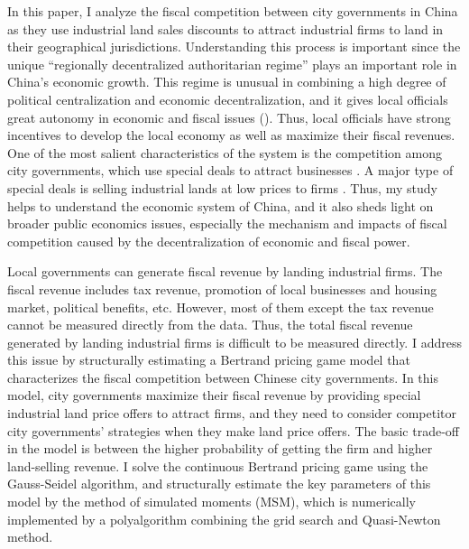 In this paper, I analyze the fiscal competition between city governments in China as they use
industrial land sales discounts to attract industrial firms to
land in their geographical jurisdictions.
Understanding this process is important since
the unique ``regionally decentralized authoritarian regime'' \citep{xu2011fundamental}
plays an important role in China's economic growth.
This regime is unusual in combining a high degree of political centralization
and economic decentralization, and it gives local officials great autonomy
in economic and fiscal issues (\citealp{kroeber2020china,xiong2018mandarin}).
Thus, local officials have strong
incentives to develop the local economy as well as maximize their fiscal revenues.
One of the most salient characteristics of the system is the
competition among city governments, which use special deals to
attract businesses \citep{bai2020special}. A major type of special deals is
selling industrial lands at low prices to firms \citep{su2017china}.
Thus, my study helps to understand the economic
system of China, and it also sheds light on broader public economics issues, especially the mechanism
and impacts of fiscal competition caused by the decentralization of economic and fiscal power.

Local governments can generate fiscal revenue by landing industrial firms.
The fiscal revenue includes tax revenue, promotion of local businesses
and housing market, political benefits, etc. However, most of them except the tax revenue cannot
be measured directly from the data. Thus, the total fiscal revenue generated by
landing industrial firms is difficult to be measured directly.
I address this issue by structurally estimating a Bertrand pricing game model
that characterizes the fiscal competition between Chinese city governments.
In this model, city governments maximize their fiscal revenue by
providing special industrial land price offers to attract firms, and they need to consider
competitor city governments' strategies when they make land price offers. The basic
trade-off in the model is between the higher probability of getting the firm
and higher land-selling revenue.
I solve the continuous Bertrand pricing game using the Gauss-Seidel algorithm,
and structurally estimate the key parameters of this model by the method of simulated moments (MSM),
which is numerically implemented by a polyalgorithm combining the grid search and Quasi-Newton method.

